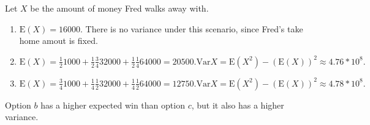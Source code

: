 Let $X$ be the amount of money Fred walks away with.

\begin{enumerate}[label=(\alph*)]

\item $\text{E}(X) = 16000$. There is no variance under this scenario, since
Fred's take home amout is fixed.

\item $\text{E}(X) = \frac{1}{2}1000 + \frac{1}{2}\frac{3}{4}32000 + \frac{1}{2}
\frac{1}{4}64000 = 20500. \text{Var}{X} = \text{E}(X^{2}) - (\text{E}(X))^{2}
\approx 4.76 * 10^{8}.$

\item $\text{E}(X) = \frac{3}{4}1000 + \frac{1}{4}\frac{1}{2}32000 + \frac{1}
{4}\frac{1}{2}64000 = 12750. \text{Var}{X} = \text{E}(X^{2}) - (\text{E}(X))^{2}
\approx 4.78 * 10^{8}.$

\end{enumerate}

Option $b$ has a higher expected win than option $c$, but it also has a higher
variance.